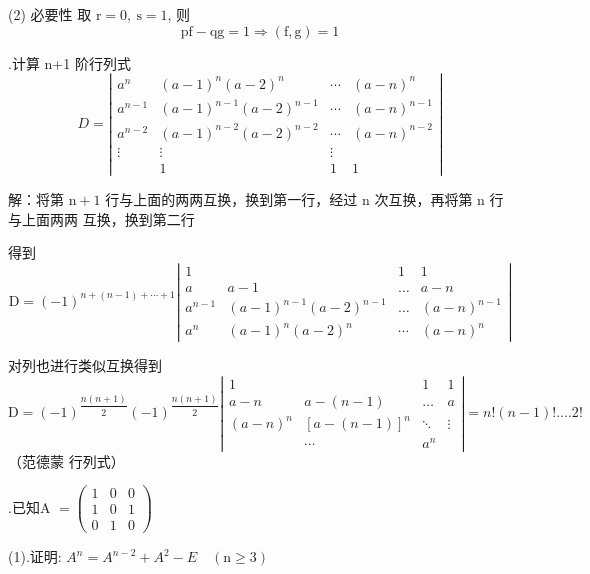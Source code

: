 \documentclass{article}
\begin{document}
(2) 必要性 取 $\mathrm{r}=0, \mathrm{~s}=1$, 则
$$
    \mathrm{pf}-\mathrm{qg}=1 \Rightarrow(\mathrm{f}, \mathrm{g})=1
$$

\vspace{1ex}
{.}计算 n+1 阶行列式
$$
    D=\left|\begin{array}{cccc}
        a^{n}   & (a-1)^{n}(a-2)^{n}     & \cdots & (a-n)^{n}   \\
        a^{n-1} & (a-1)^{n-1}(a-2)^{n-1} & \cdots & (a-n)^{n-1} \\
        a^{n-2} & (a-1)^{n-2}(a-2)^{n-2} & \cdots & (a-n)^{n-2} \\
        \vdots  & \vdots                 & \vdots               \\
                & 1                      & 1      & 1
    \end{array}\right|
$$

解：将第 $\mathrm{n}+1$ 行与上面的两两互换，换到第一行，经过 $\mathrm{n}$ 次互换，再将第 $\mathrm{n}$ 行与上面两两 互换，换到第二行

得到
$$
    \mathrm{D}=(-1)^{n+(n-1)+\cdots+1}\left|\begin{array}{cccc}
        1       &                        & 1      & 1           \\
        a       & a-1                    & \ldots & a-n         \\
        a^{n-1} & (a-1)^{n-1}(a-2)^{n-1} & \ldots & (a-n)^{n-1} \\
        a^{n}   & (a-1)^{n}(a-2)^{n}     & \cdots & (a-n)^{n}
    \end{array}\right|
$$

对列也进行类似互换得到
$\mathrm{D}=(-1)^{\dfrac{n(n+1)}{2}}(-1)^{\dfrac{n(n+1)}{2}}\left|\begin{array}{cccc}1 & & 1 & 1 \\ a-n & a-(n-1) & \ldots & a \\ (a-n)^{n} & {[a-(n-1)]^{n}} & \ddots & \vdots \\ & \cdots & a^{n}\end{array}\right|=n !(n-1) ! \ldots .2 ! $（范德蒙
行列式）

\vspace{1ex}
{.}已知A $=\left(\begin{array}{lll}1 & 0 & 0 \\ 1 & 0 & 1 \\ 0 & 1 & 0\end{array}\right)$

(1).证明: $A^{n}=A^{n-2}+A^{2}-E \quad(\mathrm{n} \geq 3)$
\end{document}
